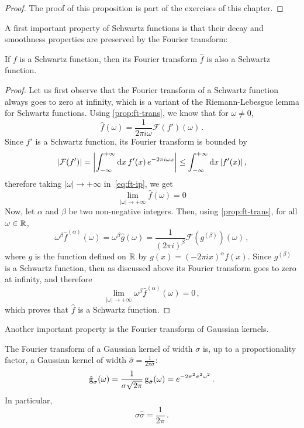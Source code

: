\begin{proof}
	The proof of this proposition is part of the exercises of this chapter.
\end{proof}
A first important property of Schwartz functions is that their decay and smoothness
properties are preserved by the Fourier transform:
\begin{theorem}
	If $f$ is a Schwartz function, then its Fourier transform $\hat{f}$ is also a Schwartz
	function.
\end{theorem}
\begin{proof}
	Let us first observe that the Fourier transform of a Schwartz function always goes to
	zero at infinity, which is a variant of the Riemann-Lebesgue lemma for Schwartz
	functions. Using \cref{prop:ft-trans}, we know that for $\omega\neq 0$,
	\begin{equation}
		\hat{f}(\omega)=\frac{1}{2\pi i\omega}\mathcal{F}(f')(\omega)\,.\label{eq:ft-ip}
	\end{equation}
	Since $f'$ is a Schwartz function, its Fourier transform is bounded by
	\begin{equation}
		|\mathcal{F}(f')|=\left|\int_{-\infty}^{+\infty}\mathrm{d}{x}\,f'(x)\,e^{-2\pi i \omega x}\right|\leq
		\int_{-\infty}^{+\infty}\mathrm{d}{x}\,|f'(x)|\,,
	\end{equation}
	therefore taking $|\omega|\to+\infty$ in~\cref{eq:ft-ip}, we get
	\begin{equation}
		\lim_{|\omega|\to+\infty}\hat{f}(\omega)=0
	\end{equation}
	Now, let $\alpha$ and $\beta$ be two non-negative integers. Then, using
	\cref{prop:ft-trans}, for all $\omega\in\mathbb{R}$,
	\begin{equation}
		\omega^\beta\hat{f}^{(\alpha)}(\omega)=\omega^\beta\hat{g}(\omega)
		=\frac{1}{(2\pi i)^{\beta}}\mathcal{F}(g^{(\beta)})(\omega)\,,
	\end{equation}
	where $g$ is the function defined on $\mathbb{R}$ by $g(x)=(-2\pi ix)^{\alpha}f(x)$.
	Since $g^{(\beta)}$ is a Schwartz function, then as
	discussed above its Fourier transform goes to zero at infinity, and therefore
	\begin{equation}
		\lim_{|\omega|\to+\infty}\omega^\beta\hat{f}^{(\alpha)}(\omega)=0\,,
	\end{equation}
	which proves that $\hat{f}$ is a Schwartz function.
\end{proof}
Another important property is the Fourier transform of Gaussian kernels.
\begin{theorem}
	\label{thm:gauss-uncertainty}
	The Fourier transform of a Gaussian kernel of width $\sigma$ is, up to a proportionality
	factor, a Gaussian kernel of width $\hat{\sigma}=\frac{1}{2\pi\sigma}$:
	\begin{equation}
		\hat{\operatorname{g}}_{\sigma}(\omega)=
		\frac{1}{\sigma\sqrt{2\pi}}\operatorname{g}_{\hat{\sigma}}(\omega)
		=e^{-2\pi^2\sigma^2\omega^2}\,.
	\end{equation}
	In particular,
	\begin{equation}
		\sigma\hat{\sigma}=\frac{1}{2\pi}\,.\label{eq:gauss-uncertainty}
	\end{equation}
\end{theorem}
